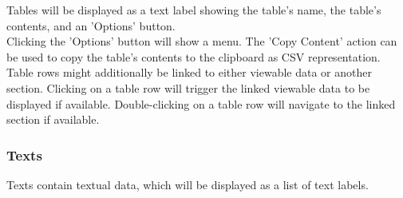 Tables will be displayed as a text label showing the table's name, the table's contents, 
and an 'Options' button. \\

Clicking the 'Options' button will show a menu.
The 'Copy Content' action can be used to copy the table's contents to the clipboard as CSV representation. \\

Table rows might additionally be linked to either viewable data or another section.
Clicking on a table row will trigger the linked viewable data to be displayed if available.
Double-clicking on a table row will navigate to the linked section if available.

\subsubsection{Texts} 
\label{sec:report_section_texts}

Texts contain textual data, which will be displayed as a list of text labels. \\

